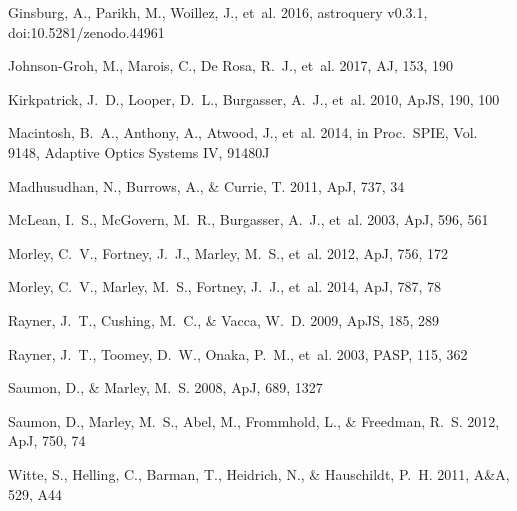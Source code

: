 \documentclass[usenatbib]{basi}
\newcommand\aj{{AJ}}%
\newcommand\apj{{ApJ}}%
\newcommand\apjs{{ApJS}}%
\newcommand\aap{{A\&A}}%
\newcommand\pasp{{PASP}}%
\newcommand\procspie{{Proc.~SPIE}}%
\begin{document}
\begin{thebibliography}{}
Ginsburg, A., Parikh, M., Woillez, J., {et~al.} 2016, astroquery v0.3.1,
  doi:10.5281/zenodo.44961

{Johnson-Groh}, M., {Marois}, C., {De Rosa}, R.~J., {et~al.} 2017, \aj, 153,
  190

{Kirkpatrick}, J.~D., {Looper}, D.~L., {Burgasser}, A.~J., {et~al.} 2010,
  \apjs, 190, 100

{Macintosh}, B.~A., {Anthony}, A., {Atwood}, J., {et~al.} 2014, in \procspie,
  Vol. 9148, Adaptive Optics Systems IV, 91480J

{Madhusudhan}, N., {Burrows}, A., \& {Currie}, T. 2011, \apj, 737, 34

{McLean}, I.~S., {McGovern}, M.~R., {Burgasser}, A.~J., {et~al.} 2003, \apj,
  596, 561

{Morley}, C.~V., {Fortney}, J.~J., {Marley}, M.~S., {et~al.} 2012, \apj, 756,
  172

{Morley}, C.~V., {Marley}, M.~S., {Fortney}, J.~J., {et~al.} 2014, \apj, 787,
  78

{Rayner}, J.~T., {Cushing}, M.~C., \& {Vacca}, W.~D. 2009, \apjs, 185, 289

{Rayner}, J.~T., {Toomey}, D.~W., {Onaka}, P.~M., {et~al.} 2003, \pasp, 115,
  362

{Saumon}, D., \& {Marley}, M.~S. 2008, \apj, 689, 1327

{Saumon}, D., {Marley}, M.~S., {Abel}, M., {Frommhold}, L., \& {Freedman},
  R.~S. 2012, \apj, 750, 74

{Witte}, S., {Helling}, C., {Barman}, T., {Heidrich}, N., \& {Hauschildt},
  P.~H. 2011, \aap, 529, A44

\end{thebibliography}


%
%

\label{lastpage}
\end{document}
